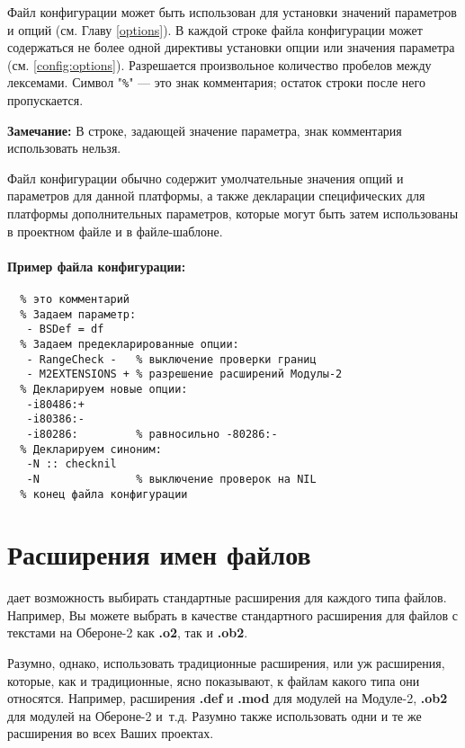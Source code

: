 Файл конфигурации может быть использован для установки значений
параметров и опций (см. Главу \ref{options}). 
В каждой строке файла конфигурации может содержаться не более одной
директивы установки опции или значения параметра (см. \ref{config:options}). 
Разрешается произвольное количество пробелов между лексемами.
Символ "\verb|%|" --- это знак комментария; остаток строки после
него пропускается.

{\bf Замечание:} В строке, задающей значение параметра, знак комментария
использовать нельзя.

Файл конфигурации обычно содержит умолчательные значения опций и 
параметров для данной платформы, а также декларации специфических для 
платформы дополнительных параметров, которые могут быть затем 
использованы в проектном файле и в файле-шаблоне.

\paragraph{Пример файла конфигурации:}
\begin{verbatim}
  % это комментарий
  % Задаем параметр:
   - BSDef = df
  % Задаем предекларированные опции:
   - RangeCheck -   % выключение проверки границ
   - M2EXTENSIONS + % разрешение расширений Модулы-2
  % Декларируем новые опции:
   -i80486:+
   -i80386:-
   -i80286:         % равносильно -80286:-
  % Декларируем синоним:
   -N :: checknil
   -N               % выключение проверок на NIL
  % конец файла конфигурации
\end{verbatim}

\section{Расширения имен файлов}\label{config:fileext}

\xds{} дает возможность выбирать стандартные расширения для каждого
типа файлов. Например, Вы можете выбрать в качестве стандартного 
расширения для файлов с текстами на Обероне-2 как
{\bf .o2}, так и {\bf .ob2}.

Разумно, однако, использовать традиционные расширения, или уж расширения,
которые, как и традиционные, ясно показывают, к файлам какого типа они
относятся. Например, расширения
{\bf.def} 
и {\bf.mod} 
для модулей на Модуле-2,
{\bf .ob2} 
для модулей на Обероне-2 и~т.д.
Разумно также использовать одни и те же расширения во всех 
Ваших проектах.

